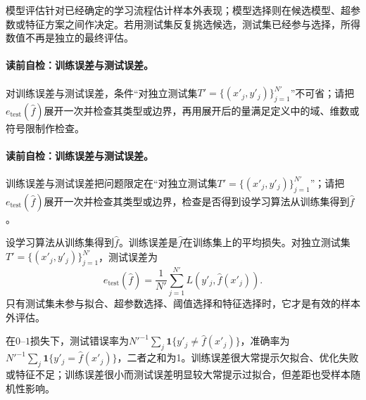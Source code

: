 模型评估针对已经确定的学习流程估计样本外表现；模型选择则在候选模型、超参数或特征方案之间作决定。若用测试集反复挑选候选，测试集已经参与选择，所得数值不再是独立的最终评估。

\paragraph{读前自检：训练误差与测试误差。}对训练误差与测试误差，条件“对独立测试集$T'=\{(x'_j,y'_j)\}_{j=1}^{N'}$”不可省；请把$e_{\mathrm{test}}(\widehat f)$展开一次并检查其类型或边界，再用展开后的量满足定义中的域、维数或符号限制作检查。\par

\paragraph{读前自检：训练误差与测试误差。}训练误差与测试误差把问题限定在“对独立测试集$T'=\{(x'_j,y'_j)\}_{j=1}^{N'}$”；请把$e_{\mathrm{test}}(\widehat f)$展开一次并检查其类型或边界，检查是否得到设学习算法从训练集得到$\widehat f$。\par

\begin{definition}[训练误差与测试误差]
设学习算法从训练集得到$\widehat f$。训练误差是$\widehat f$在训练集上的平均损失。对独立测试集$T'=\{(x'_j,y'_j)\}_{j=1}^{N'}$，测试误差为
\[
e_{\mathrm{test}}(\widehat f)=\frac1{N'}\sum_{j=1}^{N'}L(y'_j,\widehat f(x'_j)).
\]
只有测试集未参与拟合、超参数选择、阈值选择和特征选择时，它才是有效的样本外评估。
\end{definition}

在$0$--$1$损失下，测试错误率为$N'^{-1}\sum_j\mathbf1\{y'_j\ne\widehat f(x'_j)\}$，准确率为$N'^{-1}\sum_j\mathbf1\{y'_j=\widehat f(x'_j)\}$，二者之和为1。训练误差很大常提示欠拟合、优化失败或特征不足；训练误差很小而测试误差明显较大常提示过拟合，但差距也受样本随机性影响。

